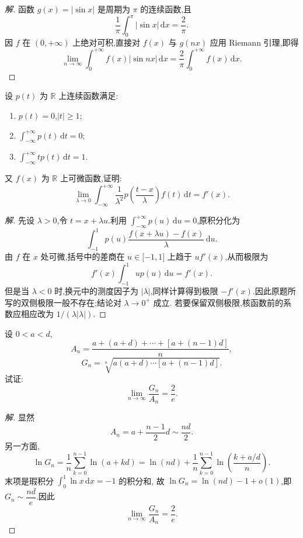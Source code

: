 \documentclass[../../数学分析培优讲义(答案版).tex]{subfiles}
\begin{document}
\begin{proof}[解]
函数 $g(x)=|\sin x|$ 是周期为 $\pi$ 的连续函数,且
\[
    \dfrac{1}{\pi}\int_0^\pi|\sin x|\,\mathrm{d}x=\dfrac{2}{\pi}.
\]
因 $f$ 在 $(0,+\infty)$ 上绝对可积,直接对 $f(x)$ 与 $g(nx)$ 应用
Riemann 引理,即得
\[
    \lim\limits_{n\to\infty}\int_0^{+\infty}f(x)|\sin nx|\,\mathrm{d}x
    =\dfrac{2}{\pi}\int_0^{+\infty}f(x)\,\mathrm{d}x.
\]
\end{proof}

\begin{example}
设 $p(t)$ 为 $\mathbb{R}$ 上连续函数满足:
\begin{enumerate}[label=(\arabic*)]
    \item $p(t)=0$,$|t|\geq1$;
    \item $\displaystyle\int_{-\infty}^{+\infty}p(t)\,\mathrm{d}t=0$;
    \item $\displaystyle\int_{-\infty}^{+\infty}tp(t)\,\mathrm{d}t=1$.
\end{enumerate}
又 $f(x)$ 为 $\mathbb{R}$ 上可微函数,证明:
\[
    \lim\limits_{\lambda\to0}\int_{-\infty}^{+\infty}
    \dfrac{1}{\lambda^2}p\left(\dfrac{t-x}{\lambda}\right)f(t)\,\mathrm{d}t
    =f'(x).
\]
\end{example}

\begin{proof}[解]
先设 $\lambda>0$,令 $t=x+\lambda u$.利用
$\displaystyle\int_{-\infty}^{+\infty}p(u)\,\mathrm{d}u=0$,原积分化为
\[
    \int_{-1}^{1}p(u)\dfrac{f(x+\lambda u)-f(x)}{\lambda}\,\mathrm{d}u.
\]
由 $f$ 在 $x$ 处可微,括号中的差商在 $u\in\lbrack-1,1\rbrack$ 上趋于
$u f'(x)$,从而极限为
\[
    f'(x)\int_{-1}^{1}up(u)\,\mathrm{d}u=f'(x).
\]
但是当 $\lambda<0$ 时,换元中的测度因子为 $|\lambda|$,同样计算得到极限
$-f'(x)$.因此原题所写的双侧极限一般不存在;结论对 $\lambda\to0^+$ 成立.
若要保留双侧极限,核函数前的系数应相应改为 $1/(\lambda|\lambda|)$.
\end{proof}

\begin{example}
设 $0<a<d$,
\[
    A_n=\dfrac{a+(a+d)+\cdots+[a+(n-1)d]}{n},
\]
\[
    G_n=\sqrt[n]{a(a+d)\cdots[a+(n-1)d]}.
\]
试证:
\[
    \lim\limits_{n\to\infty}\dfrac{G_n}{A_n}=\dfrac{2}{e}.
\]
\end{example}

\begin{proof}[解]
显然
\[
    A_n=a+\dfrac{n-1}{2}d\sim\dfrac{nd}{2}.
\]
另一方面,
\[
    \ln G_n=\dfrac{1}{n}\sum\limits_{k=0}^{n-1}\ln(a+kd)
    =\ln(nd)+\dfrac{1}{n}\sum\limits_{k=0}^{n-1}
    \ln\left(\dfrac{k+a/d}{n}\right).
\]
末项是瑕积分 $\displaystyle\int_0^1\ln x\,\mathrm{d}x=-1$ 的积分和,
故 $\ln G_n=\ln(nd)-1+o(1)$,即 $G_n\sim\dfrac{nd}{e}$.因此
\[
    \lim\limits_{n\to\infty}\dfrac{G_n}{A_n}=\dfrac{2}{e}.
\]
\end{proof}
\end{document}
